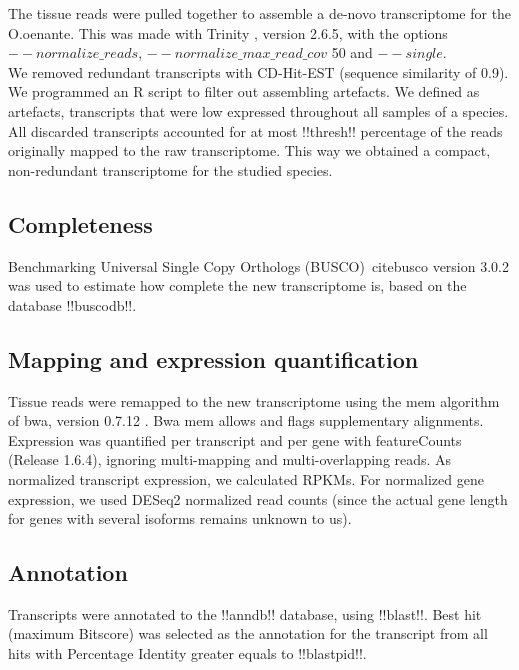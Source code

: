 \documentclass[12pt]{article}
\begin{document}
The tissue reads were pulled together to assemble a de-novo transcriptome for the O.oenante. This was made with Trinity \cite{trinity}, version 2.6.5, with the options $--normalize\_reads$, $--normalize\_max\_read\_cov$ 50 and $--single$. \\

We removed redundant transcripts with CD-Hit-EST \cite{cdhit,cdhit1} (sequence similarity of 0.9). We programmed an R script to filter out assembling artefacts. We defined as artefacts, transcripts that were low expressed throughout all samples of a species. All discarded transcripts accounted for at most !!thresh!! percentage of the reads originally mapped to the raw transcriptome. This way we obtained a compact, non-redundant transcriptome for the studied species.\\ 

\subsection{Completeness}  

Benchmarking Universal Single Copy Orthologs (BUSCO)\ cite{busco} version 3.0.2 was used to estimate how complete the new transcriptome is, based on the database !!buscodb!!. 

\subsection{Mapping and expression quantification}

Tissue reads were remapped to the new transcriptome using the mem algorithm of bwa, version 0.7.12 \cite{bwamem}. Bwa mem allows and flags supplementary alignments. \\

Expression was quantified per transcript and per gene with featureCounts \cite{featureCounts} (Release 1.6.4), ignoring multi-mapping and multi-overlapping reads. As normalized transcript expression, we calculated RPKMs. For normalized gene expression, we used DESeq2 normalized read counts (since the actual gene length for genes with several isoforms remains unknown to us).

\subsection{Annotation}

Transcripts were annotated to the !!anndb!! database, using !!blast!!. Best hit (maximum Bitscore) was selected as the annotation for the transcript from all hits with Percentage Identity greater equals to !!blastpid!!. \\
\end{document}
